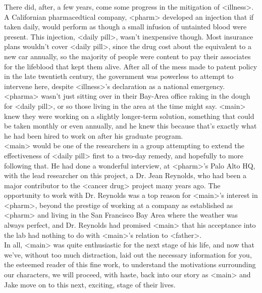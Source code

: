 \documentclass[12pt,openany]{memoir}
\begin{document}
There did, after, a few years, come some progress in the mitigation of <illness>.
A Californian pharmacedtical company, <pharm> developed an injection that if taken daily, would perform as though a small infusion of untainted blood were present.
This injection, <daily pill>, wasn't inexpensive though.
Most insurance plans wouldn't cover <daily pill>, since the drug cost about the equivalent to a new car annually, so the majority of people were content to pay their associates for the lifeblood that kept them alive.
After all of the mess made to patent policy in the late twentieth century, the government was powerless to attempt to intervene here, despite <illness>'s declaration as a national emergency.
\\

<pharma> wasn't just sitting over in their Bay-Area office raking in the dough for <daily pill>, or so those living in the area at the time might say.
<main> knew they were working on a slightly longer-term solution, something that could be taken monthly or even annually, and he knew this because that's exactly what he had been hired to work on after his graduate program.
\\

<main> would be one of the researchers in a group attempting to extend the effectiveness of <daily pill> first to a two-day remedy, and hopefully to more following that.
He had done a wonderful interview, at <pharm>'s Palo Alto HQ, with the lead researcher on this project, a Dr. Jean Reynolds, who had been a major contributor to the <cancer drug> project many years ago.
The opportunity to work with Dr. Reynolds was a top reason for <main>'s interest in <pharm>, beyond the prestige of working at a company as established as <pharm> and living in the San Francisco Bay Area where the weather was always perfect, and Dr. Reynolds had promised <main> that his acceptance into the lab had nothing to do with <main>'s relation to <father>.
\\

In all, <main> was quite enthusiastic for the next stage of his life, and now that we've, without too much distraction, laid out the necessary information for you, the esteemed reader of this fine work, to understand the motivations surrounding our characters, we will proceed, with haste, back into our story as <main> and Jake move on to this next, exciting, stage of their lives.
\\

\chapter{}
\end{document}
